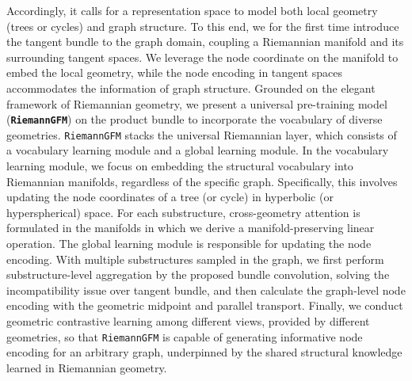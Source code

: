Accordingly, it calls for a representation space to model both local geometry (trees or cycles) and graph structure.
To this end, we for the first time introduce the tangent bundle to the graph domain, coupling a  Riemannian manifold and its surrounding tangent spaces.
We leverage the node coordinate on the manifold to embed the local geometry,
while the node encoding in tangent spaces accommodates the information of graph structure.
Grounded on the elegant framework of Riemannian geometry, we present a universal pre-training model (\textbf{\texttt{RiemannGFM}})  on the product bundle to incorporate the vocabulary of diverse geometries.
\texttt{RiemannGFM} stacks the universal Riemannian layer, which consists  of a vocabulary learning module and a global learning module.
In the vocabulary learning module, we focus on embedding the structural vocabulary into Riemannian manifolds, regardless of the specific graph.
Specifically, this involves updating the node coordinates of a tree (or cycle) in hyperbolic (or hyperspherical) space.
For each substructure, cross-geometry attention is formulated in the manifolds in which we derive a manifold-preserving linear operation.
The global learning module is responsible for updating the node encoding.
With multiple substructures sampled in the graph, we first perform substructure-level aggregation by the proposed bundle convolution, solving the incompatibility issue over tangent bundle, 
and then calculate the graph-level node encoding with the geometric midpoint and parallel transport.
Finally, we conduct geometric contrastive learning among different views, provided by different geometries, so that \texttt{RiemannGFM}  is capable of generating informative node encoding for an arbitrary graph, 
underpinned by the shared structural knowledge learned in Riemannian geometry.



